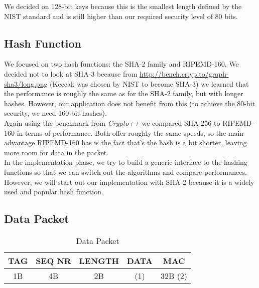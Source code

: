 \documentclass[a4paper]{article}
\begin{document}
We decided on 128-bit keys because this is the smallest length defined by the NIST standard and is still higher than our required security level of 80 bits.

\subsection{Hash Function}

We focused on two hash functions: the SHA-2 family and RIPEMD-160. We decided not to look at SHA-3 because from \url{http://bench.cr.yp.to/graph-sha3/long.png} (Keccak was chosen by NIST to become SHA-3) we learned that the performance is roughly the same as for the SHA-2 family, but with longer hashes. However, our application does not benefit from this (to achieve the 80-bit security, we need 160-bit hashes).\\

Again using the benchmark from \textit{Crypto++} we compared SHA-256 to RIPEMD-160 in terms of performance. Both offer roughly the same speeds, so the main advantage RIPEMD-160 has is the fact that's the hash is a bit shorter, leaving more room for data in the packet.\\

In the implementation phase, we try to build a generic interface to the hashing functions so that we can switch out the algorithms and compare performances. However, we will start out our implementation with SHA-2 because it is a widely used and popular hash function.

\subsection{Data Packet}

\begin{table}[h]
    \begin{center}
        \begin{tabular}{| c | c | c | c | c |}
            \hline
            TAG & SEQ NR & LENGTH & DATA & MAC \\ \hline
            1B & 4B & 2B & (1) & 32B (2) \\
            \hline
        \end{tabular}
    \end{center}
    
    \caption{Data Packet}
\end{table}
\end{document}
